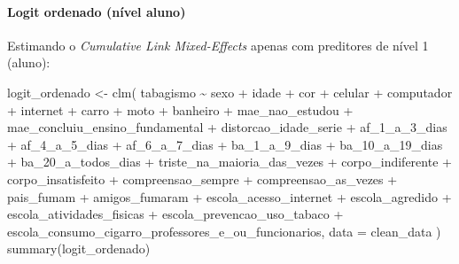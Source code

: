 \documentclass[
]{article}
\let\oldparagraph\paragraph
\renewcommand{\paragraph}[1]{\oldparagraph{#1}\mbox{}}
\newenvironment{Shaded}{\begin{snugshade}}{\end{snugshade}}
\newcommand{\AttributeTok}[1]{\textcolor[rgb]{0.40,0.45,0.13}{#1}}
\newcommand{\FunctionTok}[1]{\textcolor[rgb]{0.28,0.35,0.67}{#1}}
\newcommand{\NormalTok}[1]{\textcolor[rgb]{0.00,0.23,0.31}{#1}}
\newcommand{\OtherTok}[1]{\textcolor[rgb]{0.00,0.23,0.31}{#1}}
\newcommand{\SpecialCharTok}[1]{\textcolor[rgb]{0.37,0.37,0.37}{#1}}
\begin{document}
\hypertarget{logit-ordenado-nuxedvel-aluno}{%
\paragraph{Logit ordenado (nível
aluno)}\label{logit-ordenado-nuxedvel-aluno}}

Estimando o \emph{Cumulative Link Mixed-Effects} apenas com preditores
de nível 1 (aluno):

\begin{Shaded}
\begin{Highlighting}[]
\NormalTok{logit\_ordenado }\OtherTok{\textless{}{-}} \FunctionTok{clm}\NormalTok{(}
\NormalTok{  tabagismo }\SpecialCharTok{\textasciitilde{}}\NormalTok{ sexo }\SpecialCharTok{+}\NormalTok{ idade }\SpecialCharTok{+}\NormalTok{ cor }\SpecialCharTok{+}\NormalTok{ celular }\SpecialCharTok{+}\NormalTok{ computador }\SpecialCharTok{+}
\NormalTok{  internet }\SpecialCharTok{+}\NormalTok{ carro }\SpecialCharTok{+}\NormalTok{ moto }\SpecialCharTok{+}\NormalTok{ banheiro }\SpecialCharTok{+}
\NormalTok{  mae\_nao\_estudou }\SpecialCharTok{+}
\NormalTok{  mae\_concluiu\_ensino\_fundamental }\SpecialCharTok{+}
\NormalTok{  distorcao\_idade\_serie }\SpecialCharTok{+}\NormalTok{ af\_1\_a\_3\_dias }\SpecialCharTok{+}\NormalTok{ af\_4\_a\_5\_dias }\SpecialCharTok{+}
\NormalTok{  af\_6\_a\_7\_dias }\SpecialCharTok{+}\NormalTok{ ba\_1\_a\_9\_dias }\SpecialCharTok{+}\NormalTok{ ba\_10\_a\_19\_dias }\SpecialCharTok{+}
\NormalTok{  ba\_20\_a\_todos\_dias }\SpecialCharTok{+}
\NormalTok{  triste\_na\_maioria\_das\_vezes }\SpecialCharTok{+}\NormalTok{ corpo\_indiferente }\SpecialCharTok{+}
\NormalTok{  corpo\_insatisfeito }\SpecialCharTok{+}\NormalTok{ compreensao\_sempre }\SpecialCharTok{+}
\NormalTok{  compreensao\_as\_vezes }\SpecialCharTok{+}\NormalTok{ pais\_fumam }\SpecialCharTok{+}\NormalTok{ amigos\_fumaram }\SpecialCharTok{+}
\NormalTok{  escola\_acesso\_internet }\SpecialCharTok{+} 
\NormalTok{  escola\_agredido }\SpecialCharTok{+}
\NormalTok{  escola\_atividades\_fisicas }\SpecialCharTok{+}
\NormalTok{  escola\_prevencao\_uso\_tabaco }\SpecialCharTok{+}
\NormalTok{  escola\_consumo\_cigarro\_professores\_e\_ou\_funcionarios,}
  \AttributeTok{data =}\NormalTok{ clean\_data}
\NormalTok{)}
\FunctionTok{summary}\NormalTok{(logit\_ordenado)}
\end{Highlighting}
\end{Shaded}
\end{document}
